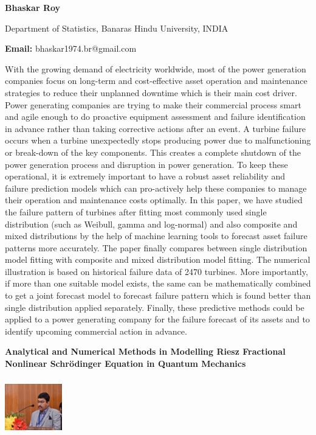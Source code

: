 \documentclass[twoside,11pt]{amsart}
\begin{document}
\centerline{\textbf{ Bhaskar Roy }}
\vskip 2mm
\begin{flushleft}
Department of Statistics, Banaras Hindu University, INDIA
\end{flushleft}
\vskip 2mm
\begin{flushleft}
{\bf Email:} bhaskar1974.br@gmail.com
\end{flushleft}

\vskip 5mm
With the growing demand of electricity worldwide, most of the power generation companies focus on long-term and cost-effective asset operation and maintenance strategies to reduce their unplanned downtime which is their main cost driver. Power generating companies are trying to make their commercial process smart and agile enough to do proactive equipment assessment and failure identification in advance rather than taking corrective actions after an event. A turbine failure occurs when a turbine unexpectedly stops producing power due to malfunctioning or break-down of the key components. This creates a complete shutdown of the power generation process and disruption in power generation.
To keep these operational, it is extremely important to have a robust asset reliability and failure prediction models which can pro-actively help these companies to manage their operation and maintenance costs optimally. In this paper, we have studied the failure pattern of turbines after fitting most commonly used single distribution (such as Weibull, gamma and log-normal) and also composite and mixed distributions by the help of machine learning tools to forecast asset failure patterns more accurately. The paper finally compares between single distribution model fitting with composite and mixed distribution model fitting. The numerical illustration is based on historical failure data of 2470 turbines.
More importantly, if more than one suitable model exists, the same can be mathematically combined to get a joint forecast model to forecast failure pattern which is found better than single distribution applied separately. Finally, these predictive methods could be applied to a power generating company for the failure forecast of its assets and to identify upcoming commercial action in advance.
\newpage
\begin{center}\bf\LARGE
Analytical and Numerical Methods in Modelling Riesz Fractional Nonlinear Schr\"{o}dinger Equation in Quantum Mechanics
\end{center}
\vskip 5mm
\begin{center}
\includegraphics[width=2.5cm, height=2.5cm, keepaspectratio=false]{SSR3.jpg}
\end{center}
\end{document}
